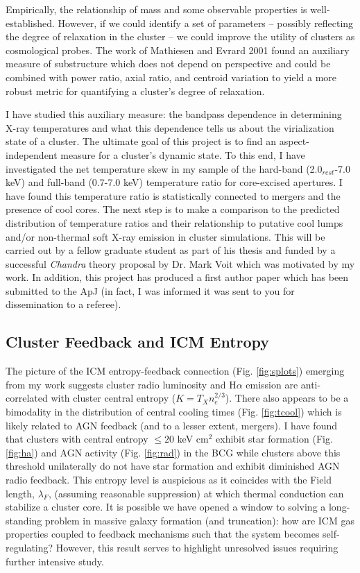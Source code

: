 \documentclass[11pt]{article}
\begin{document}
Empirically, the relationship of mass and some observable properties
is well-established. However, if we could identify a set of parameters
-- possibly reflecting the degree of relaxation in the cluster -- we
could improve the utility of clusters as cosmological probes. The work
of Mathiesen and Evrard 2001 found an auxiliary measure of substructure
which does not depend on perspective and could be combined with power
ratio, axial ratio, and centroid variation to yield a more robust
metric for quantifying a cluster's degree of relaxation.

I have studied this auxiliary measure: the bandpass dependence in
determining X-ray temperatures and what this dependence tells us about
the virialization state of a cluster. The ultimate goal of this
project is to find an aspect-independent measure for a cluster's
dynamic state. To this end, I have investigated the net temperature skew in my
sample of the hard-band (2.0$_{rest}$-7.0 keV) and full-band (0.7-7.0
keV) temperature ratio for core-excised apertures. I have found this
temperature ratio is statistically connected to mergers and the
presence of cool cores. The next step is to make a comparison to
the predicted distribution of temperature ratios and their
relationship to putative cool lumps and/or non-thermal soft X-ray
emission in cluster simulations. This will be carried out by a fellow
graduate student as part of his thesis and funded by a successful
{\textit{Chandra}} theory proposal by Dr. Mark Voit which was
motivated by my work. In addition, this project has produced a first
author paper which has been submitted to the ApJ (in fact, I was informed
it was sent to you for dissemination to a referee).

\subsection*{Cluster Feedback and ICM Entropy}

The picture of the ICM entropy-feedback connection
(Fig. \ref{fig:splots}) emerging from my work suggests cluster radio
luminosity and H$\alpha$ emission are anti-correlated with cluster
central entropy ($K=T_Xn_e^{2/3}$). There also appears to be a
bimodality in the distribution of central cooling times
(Fig. \ref{fig:tcool}) which is likely related to AGN feedback (and to
a lesser extent, mergers). I have found that clusters with central
entropy $\leq 20$ keV cm$^2$ exhibit star formation
(Fig. \ref{fig:ha}) and AGN activity (Fig. \ref{fig:rad}) in the BCG
while clusters above this threshold unilaterally do not have star formation
and exhibit diminished AGN radio feedback. This entropy level is
auspicious as it coincides with the Field length, $\lambda_F$,
(assuming reasonable suppression) at which thermal conduction can
stabilize a cluster core. It is possible we have opened a window to
solving a long-standing problem in massive galaxy formation (and
truncation): how are ICM gas properties coupled to feedback mechanisms
such that the system becomes self-regulating? However, this result
serves to highlight unresolved issues requiring further intensive
study.\\
\end{document}
